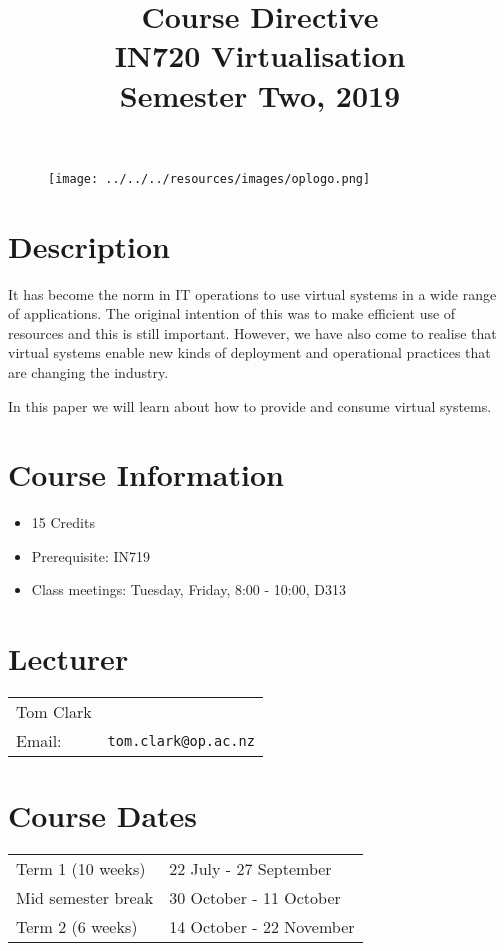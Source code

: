 \documentclass{article}
\begin{document}
\begin{figure}
\texttt{[image: ../../../resources/images/oplogo.png]}
\end{figure}

\title{Course Directive\\IN720 Virtualisation\\Semester Two, 2019}
\date{}
\maketitle

\section*{Description}
It has become the norm in IT operations to use virtual systems in a wide range of applications.  The original intention of this was to make efficient use of resources and this is still important.  However, we have also come to realise that virtual systems enable new kinds of deployment and operational practices that are changing the industry.

In this paper we will learn about how to provide and consume virtual systems.

\section*{Course Information}
\begin{itemize}
  \item 15 Credits
  \item Prerequisite: IN719
  \item Class meetings: Tuesday, Friday, 8:00 - 10:00, D313
\end{itemize}

\section*{Lecturer}
\begin{tabular}{lr}

  Tom Clark &    \\
     Email: & \texttt{tom.clark@op.ac.nz} \\
\end{tabular}

\section*{Course Dates}
\begin{tabular}{ll}
Term 1 (10 weeks) & 22 July - 27 September \\
Mid semester break & 30 October - 11 October \\
Term 2 (6 weeks) & 14 October - 22 November \\
\end{tabular}
\end{document}
